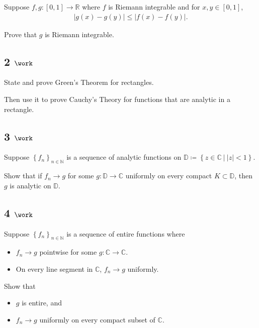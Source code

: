 Suppose \(f, g: [0, 1] \to {\mathbb{R}}\) where \(f\) is Riemann
integrable and for \(x, y\in [0, 1]\),
\begin{align*}
{\left\lvert {g(x) - g(y)} \right\rvert} \leq {\left\lvert {f(x) - f(y)} \right\rvert}
.\end{align*}

Prove that \(g\) is Riemann integrable.

\hypertarget{work-29}{%
\subsection{\texorpdfstring{2
\(\work\)}{2 \textbackslash work}}\label{work-29}}

State and prove Green's Theorem for rectangles.

Then use it to prove Cauchy's Theory for functions that are analytic in
a rectangle.

\hypertarget{work-30}{%
\subsection{\texorpdfstring{3
\(\work\)}{3 \textbackslash work}}\label{work-30}}

Suppose \(\left\{{f_n}\right\}_{n\in {\mathbb{N}}}\) is a sequence of
analytic functions on
\({\mathbb{D}}\coloneqq\left\{{z\in {\mathbb{C}}{~\mathrel{\Big|}~}{\left\lvert {z} \right\rvert} < 1}\right\}\).

Show that if \(f_n\to g\) for some \(g: {\mathbb{D}}\to {\mathbb{C}}\)
uniformly on every compact \(K\subset {\mathbb{D}}\), then \(g\) is
analytic on \({\mathbb{D}}\).

\hypertarget{work-31}{%
\subsection{\texorpdfstring{4
\(\work\)}{4 \textbackslash work}}\label{work-31}}

Suppose \(\left\{{f_n}\right\}_{n\in {\mathbb{N}}}\) is a sequence of
entire functions where

\begin{itemize}
\tightlist
\item
  \(f_n \to g\) pointwise for some \(g:{\mathbb{C}}\to{\mathbb{C}}\).
\item
  On every line segment in \({\mathbb{C}}\), \(f_n \to g\) uniformly.
\end{itemize}

Show that

\begin{itemize}
\tightlist
\item
  \(g\) is entire, and
\item
  \(f_n\to g\) uniformly on every compact subset of \({\mathbb{C}}\).
\end{itemize}


